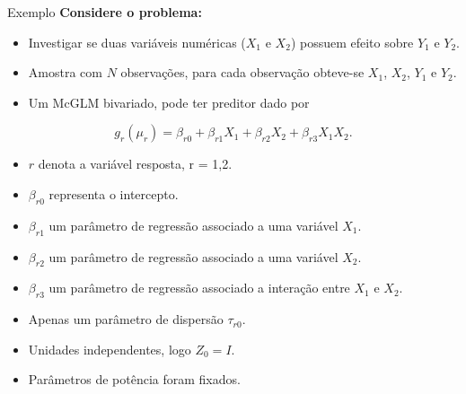 \documentclass[
  ignorenonframetext,
  serif,
  professionalfont,
  usenames,
  dvipsnames,
  aspectratio = 169]{beamer}
\def\endColumns{\end{minipage}}%
\def\beginAHalfColumnT{\begin{minipage}[t]{0.49\textwidth}}%
\begin{document}
\begin{frame}{Exemplo}
\protect\hypertarget{exemplo}{}
\textbf{Considere o problema:}

\begin{itemize}
  
  \item Investigar se duas variáveis numéricas ($X_1$ e $X_2$) possuem efeito sobre $Y_1$ e $Y_2$.
  
  \item Amostra com $N$ observações, para cada observação obteve-se $X_1$, $X_2$, $Y_1$ e $Y_2$.

  \item Um McGLM bivariado, pode ter preditor dado por

\end{itemize}

\[
g_r(\mu_r) = \beta_{r0} + \beta_{r1} X_1 + \beta_{r2} X_2 + \beta_{r3} X_1X_2.
\] \beginAHalfColumnT

\begin{itemize}
  \itemsep 1ex
  \item $r$ denota a variável resposta, r = 1,2.
  \item $\beta_{r0}$ representa o intercepto.
  \item $\beta_{r1}$ um parâmetro de regressão associado a uma variável $X_1$. 
  \item $\beta_{r2}$ um parâmetro de regressão associado a uma variável $X_2$.
\end{itemize}  
\endColumns    
\beginAHalfColumnT

\begin{itemize}
  \itemsep 1ex
  \item $\beta_{r3}$ um parâmetro de regressão associado a interação entre $X_1$ e $X_2$. 
  \item Apenas um parâmetro de dispersão $\tau_{r0}$.
  \item Unidades independentes, logo $Z_0 = I$.
  \item Parâmetros de potência foram fixados.
\end{itemize}

\endColumns
\end{frame}
\end{document}
